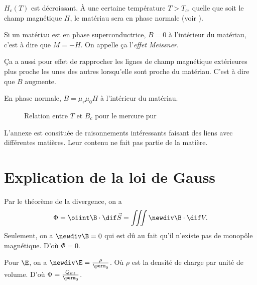 $H_c(T)$ est décroissant.
À une certaine température $T > T_c$, quelle que soit le champ magnétique $H$,
le matériau sera en phase normale (voir ).

Si un matériau est en phase superconductrice,
$B = 0$ à l'intérieur du matériau, c'est à dire que $M = -H$.
On appelle ça l'\emph{effet Meissner}.

Ça a aussi pour effet de rapprocher les lignes de champ magnétique extérieures
plus proche les unes des autres lorsqu'elle sont proche du matériau.
C'est à dire que $B$ augmente.

En phase normale, $B = \mu_r \mu_0 H$ à l'intérieur du matériau.

\begin{figure}
  \begin{center}
  \end{center}
  \caption{Relation entre $T$ et $B_c$ pour le mercure pur}
  \label{fig:tbc}
\end{figure}

\annexe
L'annexe est consituée de raisonnements intéressants
faisant des liens avec différentes matières.
Leur contenu ne fait pas partie de la matière.
\section{Explication de la loi de Gauss}
\label{ann:gauss}
Par le théorème de la divergence, on a
\[ \Phi = \oiint \B \cdot \dif \vec S = \iiint \newdiv \B \cdot \dif V. \]
Seulement, on a $\newdiv \B = 0$ qui est dû au fait
qu'il n'existe pas de monopôle magnétique.
D'où $\Phi = 0$.

Pour $\E$, on a $\newdiv \E = \frac{\rho}{\perm_0}$.
Où $\rho$ est la densité de charge par unité de volume.
D'où $\Phi = \frac{Q_\mathrm{int}}{\perm_0}$.



